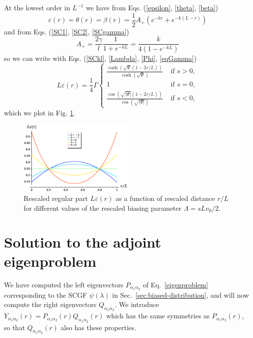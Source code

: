 \documentclass[pre,aps,superscriptaddress,nofootinbib]{revtex4}
\begin{document}
At the lowest order in $L^{-1}$ we have from Eqs. (\ref{epsilon}, \ref{theta}, \ref{beta})
\begin{equation}
\varepsilon(r) = \theta(r) = \beta(r) = \frac{1}{2} A_+ (e^{-kr} + e^{-k(L-r)})
\end{equation}
and from Eqs. (\ref{SC1}, \ref{SC2}, \ref{SCgamma})
\begin{equation}
A_+ = \frac{2\gamma}{l} \frac{1}{1 + e^{-kL}} = \frac{k}{4(1 - e^{-kL})}
\end{equation}
so we can write with Eqs. (\ref{SCkl}, \ref{Lambda}, \ref{Phi}, \ref{eqGamma})
\begin{equation}
L \varepsilon(r) = \frac{1}{4} \Gamma \begin{cases} \frac{\cosh\left(\sqrt{\Psi}(1 - 2r/L)\right)}{\cosh\left(\sqrt{\Psi}\right)} &\text{ if } s > 0, \\ 1 &\text{ if } s = 0, \\ \frac{\cos\left(\sqrt{|\Psi|}(1 - 2r/L)\right)}{\cos\left(\sqrt{|\Psi|}\right)} &\text{ if } s < 0, \end{cases}
\end{equation}
which we plot in Fig. \ref{fig:epsilon}.

\begin{figure}[H]
\centering
\includegraphics[width=0.5\textwidth]{epsilon.eps}
\caption{Rescaled regular part $L \varepsilon(r)$ as a function of rescaled distance $r/L$ for different values of the rescaled biasing parameter $\Lambda = s L v_0/2$.}
\label{fig:epsilon}
\end{figure}

\section{Solution to the adjoint eigenproblem}

We have computed the left eigenvectors $P_{\alpha_1\alpha_2}$ of Eq.~\ref{eigenproblem} corresponding to the SCGF $\psi(\lambda)$ in Sec.~\ref{sec:biased-distribution}, and will now compute the right eigenvectors $Q_{\alpha_1\alpha_2}$.
We introduce $Y_{\alpha_1\alpha_2}(r) = P_{\alpha_1\alpha_2}(r) Q_{\alpha_1\alpha_2}(r)$ which has the same symmetries as $P_{\alpha_1\alpha_2}(r)$, so that $Q_{\alpha_1\alpha_2}(r)$ also has these properties.\\
\end{document}
